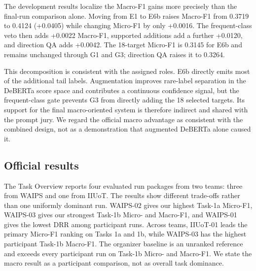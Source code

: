 \documentclass[sigconf,article,a4paper]{acmart}
\begin{document}
The development results localize the Macro-F1 gains more precisely than the
final-run comparison alone. Moving from E1 to E6b raises Macro-F1 from 0.3719
to 0.4124 (+0.0405) while changing Micro-F1 by only +0.0016. The
frequent-class veto then adds +0.0022 Macro-F1, supported additions add a
further +0.0120, and
direction QA adds +0.0042. The 18-target Micro-F1 is 0.3145 for E6b and remains
unchanged through G1 and G3; direction QA raises it to 0.3264.

This decomposition is consistent with the assigned roles. E6b directly emits
most of the additional tail labels. Augmentation improves
rare-label separation in the DeBERTa score space and contributes a continuous
confidence signal, but the frequent-class gate prevents G3 from directly
adding the 18 selected targets. Its support for the final macro-oriented system
is therefore indirect and shared with the prompt jury. We regard the official
macro advantage as consistent with the combined design, not as a demonstration
that augmented DeBERTa alone caused it.

\subsection{Official results}

The Task Overview \cite{wangFehu2026} reports four evaluated run packages from two teams: three
from WAIPS and one from IIUoT. The results show different trade-offs rather than
one uniformly dominant run. WAIPS-02 gives our highest Task-1a Micro-F1,
WAIPS-03 gives our strongest Task-1b Micro- and Macro-F1, and WAIPS-01 gives the
lowest DRR among participant runs. Across teams, IIUoT-01 leads the primary
Micro-F1 ranking on Tasks 1a and 1b, while WAIPS-03 has the highest participant
Task-1b Macro-F1. The organizer baseline is an unranked reference and exceeds
every participant run on Task-1b Micro- and Macro-F1. We state the
macro result as a participant comparison, not as overall task dominance.

\begin{table}[!t]
  \caption{Official Task-1 results. Each F1 entry is Micro / Macro. The
  organizer baseline is unranked; bold marks the best participant.}
  \label{tab:official}
  \centering
  \scriptsize
\end{table}
\end{document}
